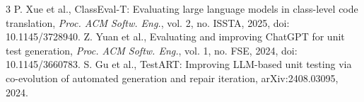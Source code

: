 \documentclass[conference]{IEEEtran}
\begin{document}
\begin{thebibliography}{3}
 P. Xue et al., ClassEval-T: Evaluating large language models in class-level code translation, \emph{Proc. ACM Softw. Eng.}, vol. 2, no. ISSTA, 2025, doi: 10.1145/3728940.
 Z. Yuan et al., Evaluating and improving ChatGPT for unit test generation, \emph{Proc. ACM Softw. Eng.}, vol. 1, no. FSE, 2024, doi: 10.1145/3660783.
 S. Gu et al., TestART: Improving LLM-based unit testing via co-evolution of automated generation and repair iteration, arXiv:2408.03095, 2024.
\end{thebibliography}
\end{document}
